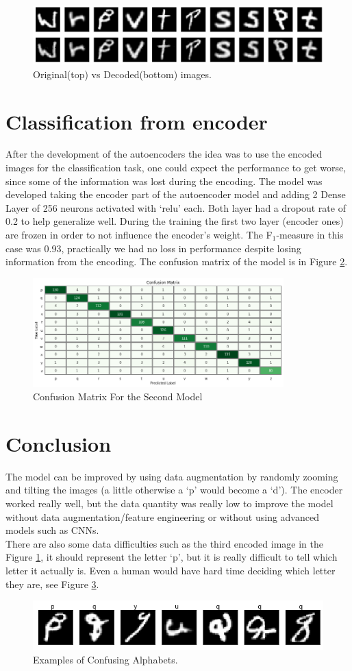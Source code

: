 \documentclass[11pt]{article}
\begin{document}
\begin{figure}[h]
	\centering
	\includegraphics[width=\linewidth]{imgs/autoencoder.png}
	\caption{Original(top) vs Decoded(bottom) images.}
	\label{fig:autoencoder}
\end{figure}

\section*{Classification from encoder}
After the development of the autoencoders the idea was to use the encoded images for the classification task, one could expect the performance to get worse, since some of the information was lost during the encoding. The model was developed taking the encoder part of the autoencoder model and adding 2 Dense Layer of 256 neurons activated with `relu' each. Both layer had a dropout rate of 0.2 to help generalize well. During the training the first two layer (encoder ones) are frozen in order to not influence the encoder's weight. The F$_1$-measure in this case was 0.93, practically we had no loss in performance despite losing information from the encoding. The confusion matrix of the model is in Figure \ref{fig:model2}.
\begin{figure}
	\centering
	\includegraphics[width=\linewidth,height=4.2cm]{imgs/model_2.png}
	\caption{Confusion Matrix For the Second Model}
	\label{fig:model2}
\end{figure}

\section*{Conclusion}
The model can be improved by using data augmentation by randomly zooming and tilting the images (a little otherwise a `p' would become a `d'). The encoder worked really well, but the data quantity was really low to improve the model without data augmentation/feature engineering or without using advanced models such as CNNs.\\
There are also some data difficulties such as the third encoded image in the Figure \ref{fig:autoencoder}, it should represent the letter `p', but it is really difficult to tell which letter it actually is. Even a human would have hard time deciding which letter they are, see Figure \ref{fig:strange}.

\begin{figure}[!h]
	\centering
	\includegraphics[width=\linewidth]{imgs/strange_letters.png}
	\caption{Examples of Confusing Alphabets.}
	\label{fig:strange}
\end{figure}
\end{document}
